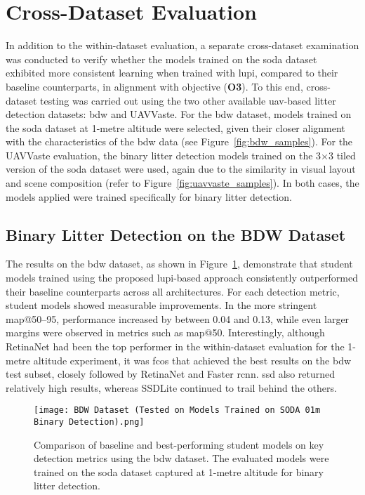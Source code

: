 \section{Cross-Dataset Evaluation}
\label{sec:5_cross_dataset_exp}

In addition to the within-dataset evaluation, a separate cross-dataset examination was conducted to verify whether the models trained on the \gls{soda} dataset exhibited more consistent learning when trained with \gls{lupi}, compared to their baseline counterparts, in alignment with objective (\textbf{O3}). To this end, cross-dataset testing was carried out using the two other available \gls{uav}-based litter detection datasets: \gls{bdw} and UAVVaste. For the \gls{bdw} dataset, models trained on the \gls{soda} dataset at 1-metre altitude were selected, given their closer alignment with the characteristics of the \gls{bdw} data (see Figure~\ref{fig:bdw_samples}). For the UAVVaste evaluation, the binary litter detection models trained on the 3$\times$3 tiled version of the \gls{soda} dataset were used, again due to the similarity in visual layout and scene composition (refer to Figure~\ref{fig:uavvaste_samples}). In both cases, the models applied were trained specifically for binary litter detection.

\subsection{Binary Litter Detection on the BDW Dataset}
\label{subsec:5_bdw_exp}

The results on the \gls{bdw} dataset, as shown in Figure~\ref{fig:bdw_bar}, demonstrate that student models trained using the proposed \gls{lupi}-based approach consistently outperformed their baseline counterparts across all architectures. For each detection metric, student models showed measurable improvements. In the more stringent \gls{map}@50--95, performance increased by between 0.04 and 0.13, while even larger margins were observed in metrics such as \gls{map}@50. Interestingly, although RetinaNet had been the top performer in the within-dataset evaluation for the 1-metre altitude experiment, it was \gls{fcos} that achieved the best results on the \gls{bdw} test subset, closely followed by RetinaNet and Faster \gls{rcnn}. \gls{ssd} also returned relatively high results, whereas SSDLite continued to trail behind the others.

\begin{figure}[!ht]
    \centering
    \texttt{[image: BDW Dataset (Tested on Models Trained on SODA 01m Binary Detection).png]}
    \caption{Comparison of baseline and best-performing student models on key detection metrics using the \gls{bdw} dataset. The evaluated models were trained on the \gls{soda} dataset captured at 1-metre altitude for binary litter detection.}
    \label{fig:bdw_bar}
\end{figure}

